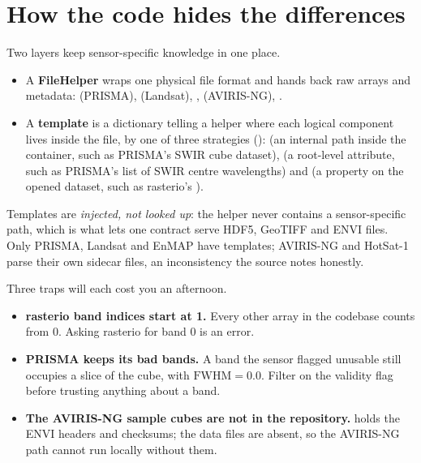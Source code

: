 \section{How the code hides the differences}\label{sec:sensors:helpers}

Two layers keep sensor-specific knowledge in one place.

\begin{itemize}
\item A \textbf{FileHelper} wraps one physical file format and hands back raw
arrays and metadata:  (PRISMA),  (Landsat), ,
 (AVIRIS-NG), .
\item A \textbf{template} is a dictionary telling a helper where each
logical component lives inside the file, by one of three strategies
():  (an internal path
inside the container, such as PRISMA's SWIR cube dataset),  (a root-level
attribute, such as PRISMA's list of SWIR centre wavelengths) and 
(a property on the opened dataset, such as rasterio's ).
\end{itemize}
Templates are \emph{injected, not looked up}: the helper never contains a sensor-specific path,
which is what lets one contract serve HDF5, GeoTIFF and ENVI files. Only PRISMA, Landsat and
EnMAP have templates; AVIRIS-NG and HotSat-1 parse their own sidecar files, an inconsistency the
source notes honestly.

Three traps will each cost you an afternoon.
\begin{itemize}
\item \textbf{rasterio band indices start at 1.} Every other array in the codebase counts from
$0$. Asking rasterio for band $0$ is an error.
\item \textbf{PRISMA keeps its bad bands.} A band the sensor flagged unusable still occupies a
slice of the cube, with $\mathrm{FWHM} = 0.0$. Filter on the validity flag before trusting
anything about a band.
\item \textbf{The AVIRIS-NG sample cubes are not in the repository.}
 holds the ENVI  headers and  checksums;
the  data files are absent, so the AVIRIS-NG path cannot run locally without them.
\end{itemize}

